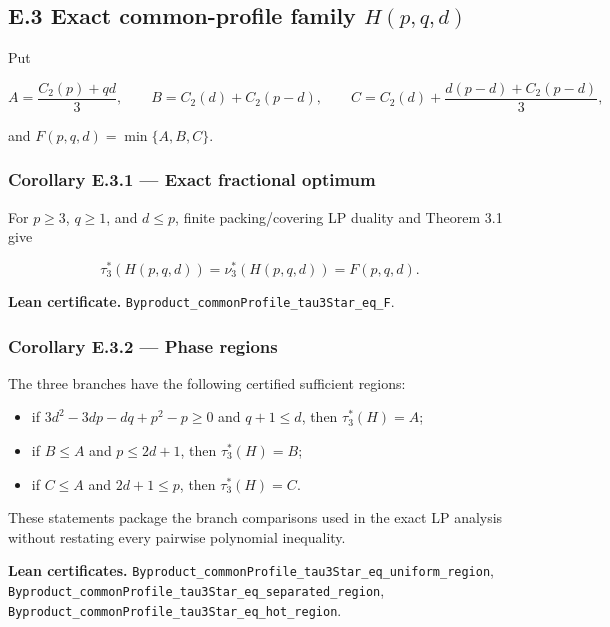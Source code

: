 \documentclass[
  american,
  11pt,
  a4paper,
]{article}
\providecommand{\tightlist}{%
  \setlength{\itemsep}{0pt}\setlength{\parskip}{0pt}}
\begin{document}
\subsection{\texorpdfstring{E.3 Exact common-profile family \(H(p,q,d)\)}{E.3 Exact common-profile family H(p,q,d)}}\label{e.3-exact-common-profile-family-hpqd}

Put

\[
A=\frac{C_2(p)+qd}{3},\qquad
B=C_2(d)+C_2(p-d),\qquad
C=C_2(d)+\frac{d(p-d)+C_2(p-d)}{3},
\]

and \(F(p,q,d)=\min\{A,B,C\}\).

\subsubsection{Corollary E.3.1 --- Exact fractional optimum}\label{corollary-e.3.1-exact-fractional-optimum}

For \(p\ge3\), \(q\ge1\), and \(d\le p\), finite packing/covering LP duality and Theorem 3.1 give

\[
\tau_3^*(H(p,q,d))=\nu_3^*(H(p,q,d))=F(p,q,d).
\]

\textbf{Lean certificate.} \texttt{Byproduct\_commonProfile\_tau3Star\_eq\_F}.

\subsubsection{Corollary E.3.2 --- Phase regions}\label{corollary-e.3.2-phase-regions}

The three branches have the following certified sufficient regions:

\begin{itemize}
\tightlist
\item
  if \(3d^2-3dp-dq+p^2-p\ge0\) and \(q+1\le d\), then \(\tau_3^*(H)=A\);
\item
  if \(B\le A\) and \(p\le2d+1\), then \(\tau_3^*(H)=B\);
\item
  if \(C\le A\) and \(2d+1\le p\), then \(\tau_3^*(H)=C\).
\end{itemize}

These statements package the branch comparisons used in the exact LP analysis without restating every pairwise polynomial inequality.

\textbf{Lean certificates.} \texttt{Byproduct\_commonProfile\_tau3Star\_eq\_uniform\_region}, \texttt{Byproduct\_commonProfile\_tau3Star\_eq\_separated\_region}, \texttt{Byproduct\_commonProfile\_tau3Star\_eq\_hot\_region}.
\end{document}
